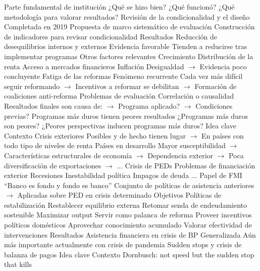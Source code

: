 \documentclass{nuevotema}
\begin{document}
\begin{esquemal}
				\4 Parte fundamental de institución
				\4[] ¿Qué se hizo bien?
				\4[] ¿Qué funcionó?
				\4[] ¿Qué metodología para valorar resultados?
			\3 Revisión de la condicionalidad y el diseño
				\4 Completada en 2019
				\4 Propuesta de marco sistemático de evaluación
				\4 Construcción de indicadores para revisar condicionalidad
			\3 Resultados
				\4 Reducción de desequilibrios internos y externos
				\4[] Evidencia favorable
				\4[] Tienden a reducirse tras implementar programas
				\4 Otros factores relevantes
				\4[] Crecimiento
				\4[] Distribución de la renta
				\4[] Acceso a mercados financieros
				\4[] Inflación
				\4[] Desigualdad
				\4[] $\to$ Evidencia poco concluyente
				\4 Fatiga de las reformas
				\4[] Fenómeno recurrente
				\4[] Cada vez más difícil seguir reformando
				\4[] $\to$ Incentivos a reformar se debilitan
				\4[] $\to$ Formación de coaliciones anti-reforma
			\3 Problemas de evaluación
				\4 Correlación o causalidad
				\4[] Resultados finales son causa de:
				\4[] $\to$ Programa aplicado?
				\4[] $\to$ Condiciones previas?
				\4 Programas más duros tienen peores resultados
				\4[] ¿Programas más duros son peores?
				\4[] ¿Peores perspectivas inducen programas más duros?
	\1 
		\2 Idea clave
			\3 Contexto
				\4 Crisis exteriores
				\4[] Posibles y de hecho tienen lugar
				\4[] $\to$ En países con todo tipo de niveles de renta
				\4 Países en desarrollo
				\4[] Mayor susceptibilidad
				\4[] $\to$ Características estructurales de economía
				\4[] $\to$ Dependencia exterior
				\4[] $\to$ Poca diversificación de exportaciones
				\4[] $\to$ ...
				\4 Crisis de PEDs
				\4[] Problemas de financiación exterior
				\4[] Recesiones
				\4[] Inestabilidad política
				\4[] Impagos de deuda
				\4[] ...
				\4 Papel de FMI
				\4[] ``Banco es fondo y fondo es banco''
				\4[] Conjunto de políticas de asistencia anteriores
				\4[] $\to$ Aplicadas sobre PED en crisis determinado
			\3 Objetivos
				\4 Políticas de estabilización
				\4[] Restablecer equilibrio externa
				\4[] Retomar senda de endeudamiento sostenible
				\4[] Maximizar output
				\4 Servir como palanca de reforma
				\4[] Proveer incentivos políticos domésticos
				\4 Aprovechar conocimiento acumulado
				\4 Valorar efectividad de intervenciones
			\3 Resultados
				\4 Asistencia financiera en crisis de BP
				\4[] Generalizada
				\4[] Aún más importante actualmente con crisis de pandemia
		\2 Sudden stops y crisis de balanza de pagos
			\3 Idea clave
				\4 Contexto
				\4[] Dornbusch: not speed but the sudden stop that kills

\end{esquemal}
\end{document}

